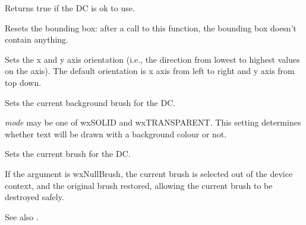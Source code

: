 Returns true if the DC is ok to use.


\label{wxdcresetboundingbox}


Resets the bounding box: after a call to this function, the bounding box
doesn't contain anything.




\label{wxdcsetaxisorientation}


Sets the x and y axis orientation (i.e., the direction from lowest to
highest values on the axis). The default orientation is 
x axis from left to right and y axis from top down.





\label{wxdcsetbackground}


Sets the current background brush for the DC.


\label{wxdcsetbackgroundmode}


{\it mode} may be one of wxSOLID and wxTRANSPARENT. This setting determines
whether text will be drawn with a background colour or not.


\label{wxdcsetbrush}


Sets the current brush for the DC.

If the argument is wxNullBrush, the current brush is selected out of the device
context, and the original brush restored, allowing the current brush to
be destroyed safely.

See also .

